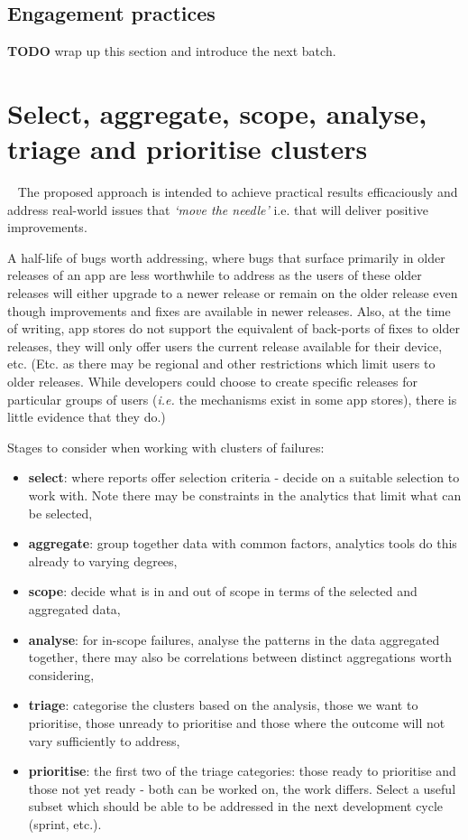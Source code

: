 \subsection{Engagement practices}

\textbf{TODO} wrap up this section and introduce the next batch.



\section{Select, aggregate, scope, analyse, triage and prioritise clusters}~\label{section-select-aggregate-scope-analyse-triage-and-prioritise}
The proposed approach is intended to achieve practical results efficaciously and address real-world issues that \emph{`move the needle'} i.e. that will deliver positive improvements. 

A half-life of bugs worth addressing, where bugs that surface primarily in older releases of an app are less worthwhile to address as the users of these older releases will either upgrade to a newer release or remain on the older release even though improvements and fixes are available in newer releases. Also, at the time of writing, app stores do not support the equivalent of back-ports of fixes to older releases, they will only offer users the current release available for their device, etc. (Etc. as there may be regional and other restrictions which limit users to older releases. While developers could choose to create specific releases for particular groups of users (\emph{i.e.} the mechanisms exist in some app stores), there is little evidence that they do.)

Stages to consider when working with clusters of failures: 

\begin{itemize}
    \item \textbf{select}: where reports offer selection criteria - decide on a suitable selection to work with. Note there may be constraints in the analytics that limit what can be selected,
    \item \textbf{aggregate}: group together data with common factors, analytics tools do this already to varying degrees,
    \item \textbf{scope}: decide what is in and out of scope in terms of the selected and aggregated data, 
    \item \textbf{analyse}: for in-scope failures, analyse the patterns in the data aggregated together, there may also be correlations between distinct aggregations worth considering, 
    \item \textbf{triage}: categorise the clusters based on the analysis, those we want to prioritise, those unready to prioritise and those where the outcome will not vary sufficiently to address,
    \item \textbf{prioritise}: the first two of the triage categories: those ready to prioritise and those not yet ready - both can be worked on, the work differs. Select a useful subset which should be able to be addressed in the next development cycle (sprint, etc.).
\end{itemize}

